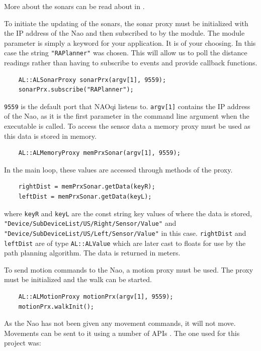 More about the sonars can be read about in \cite{sonar_ref1}.

To initiate the updating of the sonars, the sonar proxy must be initialized with the IP address of the Nao and then subscribed to by the module. The module parameter is simply a keyword for your application. It is of your choosing. In this case the string \lstinline$"RAPlanner"$ was chosen. This will allow us to poll the distance readings rather than having to subscribe to events and provide callback functions.\cite{sonar_ref2}\cite{sonar_ref3}

\begin{lstlisting}
	AL::ALSonarProxy sonarPrx(argv[1], 9559);
	sonarPrx.subscribe("RAPlanner");
\end{lstlisting}
\lstinline$9559$ is the default port that NAOqi listens to. \lstinline$argv[1]$ contains the IP address of the Nao, as it is the first parameter in the command line argument when the executable is called.
To access the sensor data a memory proxy must be used as this data is stored in memory.

\begin{lstlisting}
	AL::ALMemoryProxy memPrxSonar(argv[1], 9559);
\end{lstlisting}
In the main loop, these values are accessed through methods of the proxy.

\begin{lstlisting}
	rightDist = memPrxSonar.getData(keyR);
	leftDist = memPrxSonar.getData(keyL);
\end{lstlisting}
where \lstinline$keyR$ and \lstinline$keyL$ are the const string key values of where the data is stored, \lstinline$"Device/SubDeviceList/US/Right/Sensor/Value"$ and \lstinline$"Device/SubDeviceList/US/Left/Sensor/Value"$ in this case. \lstinline$rightDist$ and \lstinline$leftDist$ are of type \lstinline$AL::ALValue$ which are later cast to floats for use by the path planning algorithm. The data is returned in meters.

To send motion commands to the Nao, a motion proxy must be used. The proxy must be initialized and the walk can be started.

\begin{lstlisting}
	AL::ALMotionProxy motionPrx(argv[1], 9559);
	motionPrx.walkInit();
\end{lstlisting}

As the Nao has not been given any movement commands, it will not move. Movements can be sent to it using a number of APIs \cite{naodoc_motion2}. The one used for this project was:

